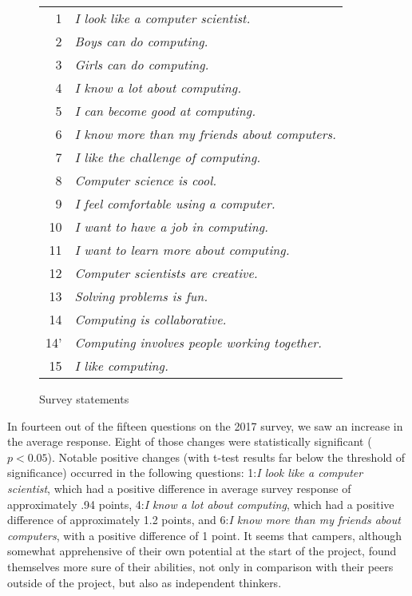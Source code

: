 \begin{figure}
{\small
\begin{tabular}{r|l}
 1 & \textit{I look like a computer scientist.} \\
 2 & \textit{Boys can do computing.} \\
 3 & \textit{Girls can do computing.} \\
 4 & \textit{I know a lot about computing.} \\
 5 & \textit{I can become good at computing.} \\
 6 & \textit{I know more than my friends about computers.} \\
 7 & \textit{I like the challenge of computing.} \\
 8 & \textit{Computer science is cool.} \\
 9 & \textit{I feel comfortable using a computer.} \\
10 & \textit{I want to have a job in computing.} \\
11 & \textit{I want to learn more about computing.} \\
12 & \textit{Computer scientists are creative.} \\
13 & \textit{Solving problems is fun.} \\
14 & \textit{Computing is collaborative.} \\
14' & \textit{Computing involves people working together.} \\
15 & \textit{I like computing.} 
\end{tabular}
}
\caption{Survey statements}
\end{figure}

In fourteen out of the fifteen questions on the 2017 survey, we saw
an increase in the average response.  Eight of those changes were
statistically significant ($p < 0.05$). Notable positive changes
(with t-test results far below the threshold of significance)
occurred in the following questions: 1:\textit{I look like a computer
scientist}, which had a positive difference in average survey
response of approximately
.94 points, 4:\textit{I know a lot about computing}, which had a positive
difference of approximately 1.2 points, and 6:\textit{I know more
than my friends about computers}, with a positive difference of 1
point.  It seems that campers, although somewhat apprehensive of
their own potential at the start of the project, found themselves
more sure of their abilities, not only in comparison with their
peers outside of the project, but also as independent thinkers.

